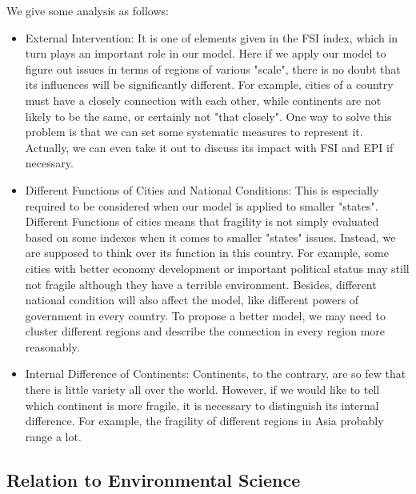 We give some analysis as follows:
\begin{itemize}
\item	External Intervention: 
It is one of elements given in the FSI index, which in turn plays an important role in our model. Here if we apply our model to figure out issues in terms of regions of various "scale", there is no doubt that its influences will be significantly different. For example, cities of a country must have a closely connection with each other, while continents are not likely to be the same, or certainly not "that closely".
One way to solve this problem is that we can set some systematic measures to represent it. Actually, we can even take it out to discuss its impact with FSI and EPI if necessary.
\item	Different Functions of Cities and National Conditions:
This is especially required to be considered when our model is applied to smaller "states". Different Functions of cities means that fragility is not simply evaluated based on some indexes when it comes to smaller "states" issues. Instead, we are supposed to think over its function in this country. For example, some cities with better economy development or important political status may still not fragile although they have a terrible environment. Besides, different national condition will also affect the model, like different powers of government in every country.
To propose a better model, we may need to cluster different regions and describe the connection in every region more reasonably.
\item	Internal Difference of Continents:
Continents, to the contrary, are so few that there is little variety all over the world. However, if we would like to tell which continent is more fragile, it is necessary to distinguish its internal difference. For example, the fragility of different regions in Asia probably range a lot.
\end{itemize}


\subsection{Relation to Environmental Science}



